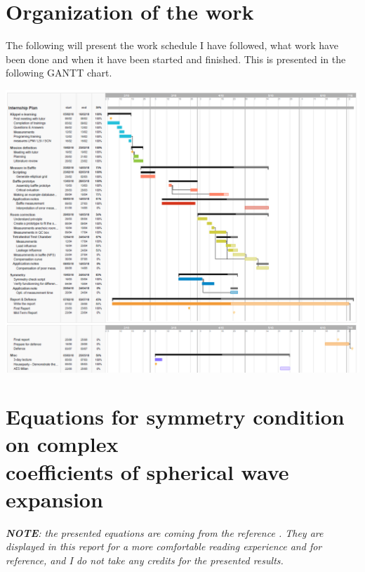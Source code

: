 \documentclass{report}
\begin{document}
\begin{appendices}

\chapter{Organization of the work}

The following will present the work schedule I have followed, what work have been done and when it have been started and finished. This is presented in the following GANTT chart.

\begin{center}
	\includegraphics[width=\textwidth]{Appendix/Plan1} 
\end{center}


\chapter{Equations for symmetry condition on complex \\ coefficients of spherical wave expansion}
\label{chap:sym}

\textit{\textbf{NOTE}: the presented equations are coming from the reference \cite{aeshs}. They are displayed in this report for a more comfortable reading experience and for reference, and I do not take any credits for the presented results.} \\


\end{appendices}
\end{document}
